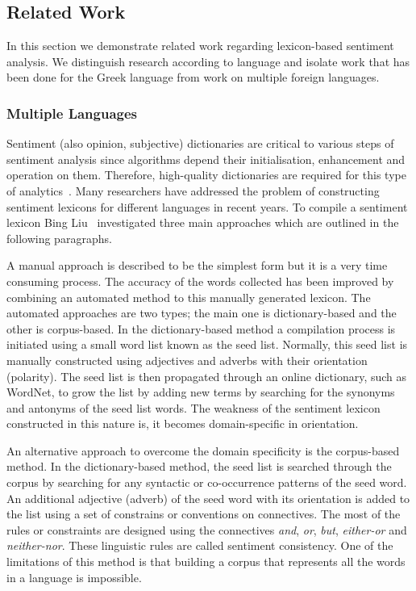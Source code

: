 \subsection{Related Work}
\label{subsec:related}

In this section we demonstrate related work regarding lexicon-based sentiment analysis.
We distinguish research according to language and isolate work
that has been done for the Greek language
from work on multiple foreign languages.

\subsubsection{Multiple Languages}
\label{subsubsec:multiple}

Sentiment (also opinion, subjective) dictionaries are critical to various steps of sentiment analysis
since algorithms depend their initialisation, enhancement and operation on them. Therefore, high-quality dictionaries are required
for this type of analytics~\cite{AKKN14}. 
Many researchers have addressed the problem
of constructing sentiment lexicons for different languages in recent years.
To compile a sentiment lexicon Bing Liu~\cite{Liu10} investigated three main approaches
which are outlined in the following paragraphs.

A manual approach is described to be the simplest form
but it is a very time consuming process.
The accuracy of the words collected has been improved
by combining an automated method to this manually generated lexicon.
The automated approaches are two types;
the main one is dictionary-based and the other is corpus-based.
In the dictionary-based method a compilation process is initiated
using a small word list known as the seed list.
Normally, this seed list is manually constructed using adjectives and adverbs
with their orientation (polarity).
The seed list is then propagated through an online dictionary,
such as WordNet, to grow the list by adding new terms
by searching for the synonyms and antonyms of the seed list words.
The weakness of the sentiment lexicon constructed in this nature is,
it becomes domain-specific in orientation.

An alternative approach to overcome the domain specificity is the corpus-based method.
In the dictionary-based method, the seed list is searched through the corpus
by searching for any syntactic or co-occurrence patterns of the seed word.
An additional adjective (adverb) of the seed word with its orientation is added
to the list using a set of constrains or conventions on connectives.
The most of the rules or constraints are designed using the connectives \emph{and}, \emph{or}, \emph{but}, \emph{either-or} and \emph{neither-nor}.
These linguistic rules are called sentiment consistency.
One of the limitations of this method is
that building a corpus that represents all the words in a language is impossible.

